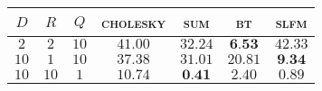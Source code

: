 
\begin{tabular}{|ccc|cccc|}
  \hline
  \abovespace\belowspace
  $D$ & $R$ & $Q$ & \textsc{cholesky} & \textsc{sum} & \textsc{bt} & \textsc{slfm}\\
\hline
  \abovespace
 $ 2 $ & $ 2 $ & $ 10 $ & $ 41.00 $ & $ 32.24 $ & $ \textbf{6.53} $ & $ 42.33 $ \\ 
 $ 10 $ & $ 1 $ & $ 10 $ & $ 37.38 $ & $ 31.01 $ & $ 20.81 $ & $ \textbf{9.34} $ \\ 
 $ 10 $ & $ 10 $ & $ 1 $ & $ 10.74 $ & $ \textbf{0.41} $ & $ 2.40 $ & $ 0.89 $ 
  \belowspace \\

  \hline
\end{tabular}

